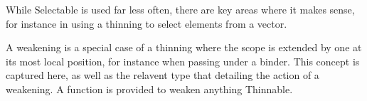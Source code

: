 While Selectable is used far less often, there are key areas where it makes
sense, for instance in using a thinning to select elements from a vector.

\begin{code}%
\>[0]\AgdaOperator{\AgdaFunction{\AgdaUnderscore{}!\AgdaUnderscore{}}}\AgdaSpace{}%
\AgdaSymbol{:}\AgdaSpace{}%
\AgdaSpace{}%
\AgdaSymbol{(}\AgdaSpace{}%
\AgdaSymbol{)}\<%
\end{code}


A weakening is a special case of a thinning where the scope is extended by
one at its most local position, for instance when passing under a binder.
This concept is captured here, as well as the relavent type that detailing
the action of a weakening. A function is provided to weaken anything Thinnable.

